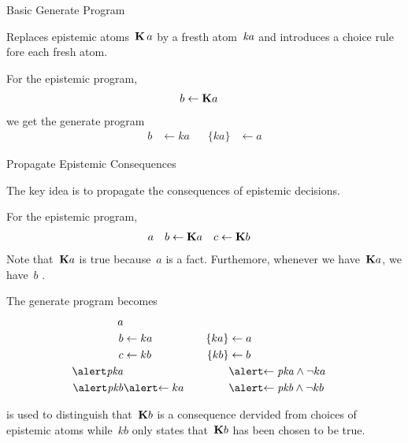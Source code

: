 \documentclass[aspectratio=169,svgnames,xcolor=table,t]{beamer}
\begin{document}
\begin{frame}{Basic Generate Program}
    \begin{myitemize}
        \item Replaces epistemic atoms~$\mathbf{K}\,a$ by a fresth atom~$\mathit{ka}$ and introduces a choice rule fore each fresh atom.
    \end{myitemize}
    For the epistemic program, 
    \begin{align*}
        b &\leftarrow \mathbf{K} a
    \end{align*}
    we get the generate program
    \begin{align*}
        b &\leftarrow ka
        &\hspace{10pt}
        \{ ka \} &\leftarrow a
    \end{align*}
\end{frame}
\begin{frame}{Propagate Epistemic Consequences}
    \begin{myitemize}
        \item[] The key idea is to propagate the consequences of epistemic decisions.
    \end{myitemize}
    For the epistemic program, 
    \begin{align*}
        a &&
        b &\leftarrow \mathbf{K} a
        &
        c &\leftarrow \mathbf{K} b
    \end{align*}
    Note that~$\mathbf{K} a$ is true because~$a$ is a fact.
    Furthemore, whenever we have~$\mathbf{K} a$, we have~$b$ .
    
    \pause

    The generate program becomes
    \begin{align*}
        a && 
        \\
        b &\leftarrow ka
        &\hspace{10pt}
        \{ ka \} &\leftarrow a
        \\
        c &\leftarrow kb
        &\hspace{10pt}
        \{ kb \} &\leftarrow b
        \\
        \hi{\kp{a}}&
        &
        &\hi{\leftarrow \kp{a} \wedge \neg ka}
        \\
        \hi{\kp{b}} &\hi{\leftarrow ka}
        &
        &\hi{\leftarrow \kp{b} \wedge \neg kb}
    \end{align*}

     is used to distinguish that~$\mathbf{K} b$ is a consequence dervided from choices of epistemic atoms while~$kb$ only states that~$\mathbf{K} b$ has been chosen to be true.
\end{frame}

\frame{\backcoverpage}
\end{document}
